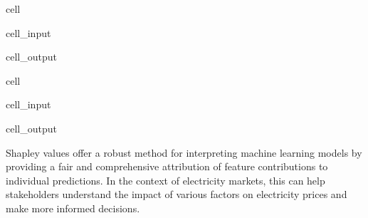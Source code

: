 \documentclass[letterpaper,10pt,english]{jupyterBook}
\begin{document}
\begin{sphinxuseclass}{cell}\begin{sphinxVerbatimInput}

\begin{sphinxuseclass}{cell_input}
\begin{sphinxVerbatim}[commandchars=\\\{\}]
   
\end{sphinxVerbatim}

\end{sphinxuseclass}\end{sphinxVerbatimInput}
\begin{sphinxVerbatimOutput}

\begin{sphinxuseclass}{cell_output}
\noindent{}

\end{sphinxuseclass}\end{sphinxVerbatimOutput}

\end{sphinxuseclass}
\begin{sphinxuseclass}{cell}\begin{sphinxVerbatimInput}

\begin{sphinxuseclass}{cell_input}
\begin{sphinxVerbatim}[commandchars=\\\{\}]
   
\end{sphinxVerbatim}

\end{sphinxuseclass}\end{sphinxVerbatimInput}
\begin{sphinxVerbatimOutput}

\begin{sphinxuseclass}{cell_output}
\noindent{}

\end{sphinxuseclass}\end{sphinxVerbatimOutput}

\end{sphinxuseclass}
\sphinxAtStartPar
Shapley values offer a robust method for interpreting machine learning models by providing a fair and comprehensive attribution of feature contributions to individual predictions. In the context of electricity markets, this can help stakeholders understand the impact of various factors on electricity prices and make more informed decisions.
\end{document}
